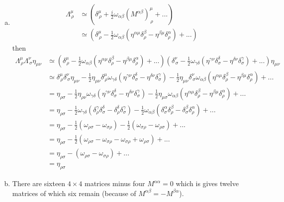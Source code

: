 \documentclass[../main.tex]{subfiles}
\begin{document}
\begin{enumerate}[(a)]
\item
\begin{align}
\Lambda^\mu_{\,\rho}
&\simeq\left(\delta^\mu_{\,\rho}+\frac{i}{2}\omega_{\alpha\beta}(M^{\alpha\beta})^\mu_{\,\rho}+...\right)\\
&\simeq\left(\delta^\mu_{\,\rho}-\frac{1}{2}\omega_{\alpha\beta}(\eta^{\alpha\mu}\delta^\beta_\rho-\eta^{\beta\mu}\delta^\alpha_\rho)+...\right)
\end{align}
then
\begin{align}
\Lambda^\mu_{\,\rho}\Lambda^\nu_{\,\sigma}\eta_{\mu\nu}
&\simeq\left(\delta^\mu_{\,\rho}-\frac{1}{2}\omega_{\alpha\beta}(\eta^{\alpha\mu}\delta^\beta_\rho-\eta^{\beta\mu}\delta^\alpha_\rho)+...\right)
\left(\delta^\nu_{\,\sigma}-\frac{1}{2}\omega_{\gamma\delta}(\eta^{\gamma\nu}\delta^\delta_\sigma-\eta^{\delta\nu}\delta^\gamma_\sigma)+...\right)
\eta_{\mu\nu}\\
&\simeq\delta^\mu_{\,\rho}\delta^\nu_{\,\sigma}\eta_{\mu\nu}
-\frac{1}{2}\eta_{\mu\nu}\delta^\mu_{\,\rho}\omega_{\gamma\delta}(\eta^{\gamma\nu}\delta^\delta_\sigma-\eta^{\delta\nu}\delta^\gamma_\sigma)
-\frac{1}{2}\eta_{\mu\nu}\delta^\nu_{\,\sigma}\omega_{\alpha\beta}(\eta^{\alpha\mu}\delta^\beta_\rho-\eta^{\beta\mu}\delta^\alpha_\rho)+...\\
&=\eta_{\rho\sigma}
-\frac{1}{2}\eta_{\rho\nu}\omega_{\gamma\delta}(\eta^{\gamma\nu}\delta^\delta_\sigma-\eta^{\delta\nu}\delta^\gamma_\sigma)
-\frac{1}{2}\eta_{\mu\sigma}\omega_{\alpha\beta}(\eta^{\alpha\mu}\delta^\beta_\rho-\eta^{\beta\mu}\delta^\alpha_\rho)+...\\
&=\eta_{\rho\sigma}
-\frac{1}{2}\omega_{\gamma\delta}(\delta^\gamma_\rho\delta^\delta_\sigma-\delta^\delta_\rho\delta^\gamma_\sigma)
-\frac{1}{2}\omega_{\alpha\beta}(\delta^\alpha_\sigma\delta^\beta_\rho-\delta^\beta_\sigma\delta^\alpha_\rho)+...\\
&=\eta_{\rho\sigma}
-\frac{1}{2}(\omega_{\rho\sigma}-\omega_{\sigma\rho})
-\frac{1}{2}(\omega_{\sigma\rho}-\omega_{\rho\sigma})+...\\
&=\eta_{\rho\sigma}
-\frac{1}{2}(\omega_{\rho\sigma}-\omega_{\sigma\rho}-\omega_{\sigma\rho}+\omega_{\rho\sigma})+...\\
&=\eta_{\rho\sigma}
-(\omega_{\rho\sigma}-\omega_{\sigma\rho})+...\\
&=\eta_{\rho\sigma}
\end{align}

\item There are sixteen $4\times4$ matrices minus four $M^{\alpha\alpha}=0$ which is gives twelve matrices of which six remain (because of $M^{\alpha\beta}=-M^{\beta\alpha}$).


\end{enumerate}
\end{document}
